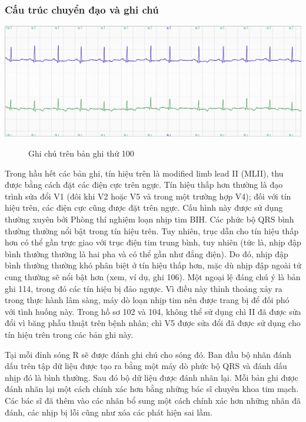 \subsubsection{Cấu trúc chuyển đạo và ghi chú}
\begin{center}
    \includegraphics[scale=.4]{image/chapter2/100bee.png}
    \begin{figure}[htp]
    \begin{center}
    \end{center}
    \caption{Ghi chú trên bản ghi thứ 100}
    \end{figure}
\end{center}
Trong hầu hết các bản ghi, tín hiệu trên là modified limb lead II (MLII), thu được bằng cách đặt các điện cực trên ngực. Tín hiệu thấp hơn thường là đạo trình sửa đổi V1 (đôi khi V2 hoặc V5 và trong một trường hợp V4); đối với tín hiệu trên, các điện cực cũng được đặt trên ngực. Cấu hình này được sử dụng thường xuyên bởi Phòng thí nghiệm loạn nhịp tim BIH. Các phức bộ QRS bình thường thường nổi bật trong tín hiệu trên. Tuy nhiên, trục dẫn cho tín hiệu thấp hơn có thể gần trực giao với trục điện tim trung bình, tuy nhiên (tức là, nhịp đập bình thường thường là hai pha và có thể gần như đẳng điện). Do đó, nhịp đập bình thường thường khó phân biệt ở tín hiệu thấp hơn, mặc dù nhịp đập ngoài tử cung thường sẽ nổi bật hơn (xem, ví dụ, ghi 106). Một ngoại lệ đáng chú ý là bản ghi 114, trong đó các tín hiệu bị đảo ngược. Vì điều này thỉnh thoảng xảy ra trong thực hành lâm sàng, máy dò loạn nhịp tim nên được trang bị để đối phó với tình huống này. Trong hồ sơ 102 và 104, không thể sử dụng chì II đã được sửa đổi vì băng phẫu thuật trên bệnh nhân; chì V5 được sửa đổi đã được sử dụng cho tín hiệu trên trong các bản ghi này.

Tại mỗi đỉnh sóng R sẽ được đánh ghi chú cho sóng đó. Ban đầu bộ nhãn đánh dấu trên tập dữ liệu được tạo ra bằng một máy dò phức bộ QRS và đánh dấu nhịp đó là bình thường. Sau đó bộ dữ liệu được đánh nhãn lại. Mỗi bản ghi được đánh nhãn lại một cách chính xác hơn bằng những bác sĩ chuyên khoa tim mạch. Các bác sĩ đã thêm vào các nhãn bổ sung một cách chính xác hơn những nhãn đã đánh, các nhịp bị lỗi cũng như xóa các phát hiện sai lầm.

